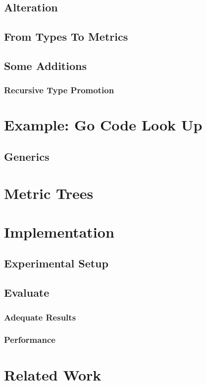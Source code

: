 \documentclass[12pt]{article}
\theoremstyle{plain}
\begin{document}
\subsection{Alteration}

\subsection{From Types To Metrics}

\subsection{Some Additions}
\subsubsection{Recursive Type Promotion}
\section{Example: Go Code Look Up}
\subsection{Generics}
\section{Metric Trees}

\section{Implementation}

\subsection{Experimental Setup}

\subsection{Evaluate}
\subsubsection{Adequate Results}
\subsubsection{Performance}

\section{Related Work}
\end{document}
